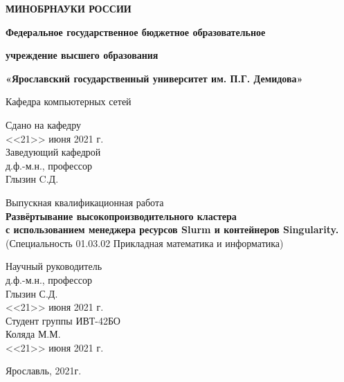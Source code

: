 \documentclass[a4paper]{extarticle}
\begin{document}
%
%
%
\begin{titlepage}
\fontsize{14pt}{12pt}
\begin{center}
\large
\textbf{МИНОБРНАУКИ РОССИИ}
\vspace{0.5cm}
			
\textbf{Федеральное государственное бюджетное образовательное}
		
\textbf{учреждение высшего образования}
		
\textbf{«Ярославский государственный университет им. П.Г. Демидова»}
\vspace{0.25cm}
			
			
Кафедра компьютерных сетей
\vfill

\begin{flushright}
Сдано на кафедру\\
<<21>> июня 2021 г.\\ 
Заведующий кафедрой\\
д.ф.-м.н., профессор\\
\underline{\hspace{2cm}}Глызин C.Д.\\
\end{flushright}
			
Выпускная квалификационная работа \\
\textbf{Развёртывание высокопроизводительного кластера} \\
\textbf{с использованием менеджера ресурсов Slurm и контейнеров Singularity.} \\
(Специальность 01.03.02 Прикладная математика и информатика) 
\vfill
\bigskip
\end{center}
\begin{flushright}
Научный руководитель\\
д.ф.-м.н., профессор\\
Глызин С.Д. \underline{\hspace{2cm}}\\
<<21>> июня 2021 г.\\
Студент группы ИВТ-42БО\\
Коляда М.М. \underline{\hspace{2cm}}\\
 <<21>> июня 2021 г.\\
\end{flushright}
\begin{center}
Ярославль, 2021г.
\end{center}
\end{titlepage}

\pagestyle{empty}
\tableofcontents
\clearpage
\pagestyle{plain}
\end{document}
